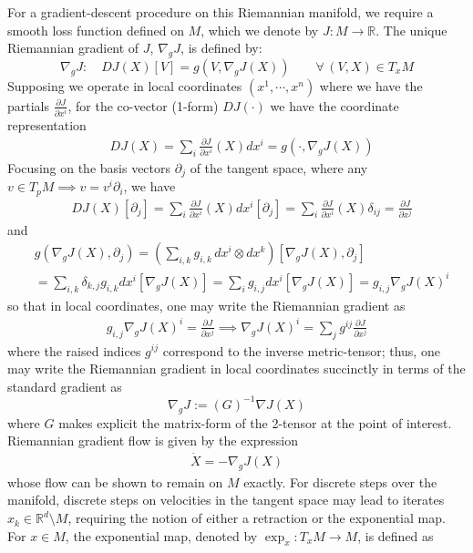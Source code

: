 \documentclass[reqno,11pt,letterpaper]{amsart}
\theoremstyle{plain}
\theoremstyle{definition}
\theoremstyle{remark}
\newcommand{\rgrad}{\nabla_{\!g}}
\begin{document}
For a gradient-descent procedure on this Riemannian manifold, we require a smooth loss function defined on $M$, which we denote by $J: M \to \mathbb{R}$. The unique Riemannian gradient of $J$, $\rgrad J$, is defined by:
\[
\rgrad J:  \quad D J(X)[V] = g(V, \rgrad J (X))
\qquad \forall \, (V,X) \in T_{x} M
\]
Supposing we operate in local coordinates $(x^{1}, \cdots, x^{n})$ where we have the partials $\frac{\partial J}{\partial x^{i}}$, for the co-vector (1-form) $D J(\cdot)$ we have the coordinate representation
\begin{align*}
& D J(X) = \sum_{i} \frac{\partial J}{\partial x^{i}}(X) dx^{i}  = g(\cdot, \rgrad J(X))
\end{align*}
Focusing on the basis vectors $\partial_{j}$ of the tangent space, where any $v \in T_{p}M \implies v = v^{i} \partial_{i}$, we have
\begin{align*}
& D J(X) [\partial_{j}] = \sum_{i} \frac{\partial J}{\partial x^{i}}(X) dx^{i}  [\partial_{j}] = \sum_{i} \frac{\partial J}{\partial x^{i}}(X) \delta_{ij} = \frac{\partial J}{\partial x^{j}} 
\end{align*}
and
\begin{align*}
&g(\rgrad J(X), \partial_{j}) =
\left( \sum_{i,k} g_{i,k} \, dx^{i} \otimes dx^{k}  \right)[\rgrad J(X), \partial_{j}] \\
&= \sum_{i,k} \delta_{k,j} g_{i,k} dx^{i} [\rgrad J (X)] 
= \sum_{i} g_{i,j} dx^{i} [\rgrad J (X)]
=
g_{i,j} \rgrad J(X)^{i}
\end{align*}
so that in local coordinates, one may write the Riemannian gradient as
\begin{align*}
    g_{i,j} \rgrad J(X)^{i} = \frac{\partial J}{\partial x^{j}} \implies \rgrad J(X)^{i} = \sum_{j} g^{ij} \frac{\partial J}{\partial x^{j}}
\end{align*}
where the raised indices $g^{ij}$ correspond to the inverse metric-tensor; thus, one may write the Riemannian gradient in local coordinates succinctly in terms of the standard gradient as
\[
\rgrad J := (G)^{-1} \nabla J (X)
\]
where $G$ makes explicit the matrix-form of the 2-tensor at the point of interest. Riemannian gradient flow is given by the expression
\begin{align}\label{eq:RGF}
\Dot{X} = - \rgrad J (X)
\end{align}
whose flow can be shown to remain on $M$ exactly. For discrete steps over the manifold, discrete steps on velocities in the tangent space may lead to iterates $x_{k} \in \mathbb{R}^{d} \setminus M$, requiring the notion of either a retraction or the exponential map. For $x \in M$, the exponential map, denoted by $\exp_{x}: T_{x}M \to M$, is defined as
\end{document}
